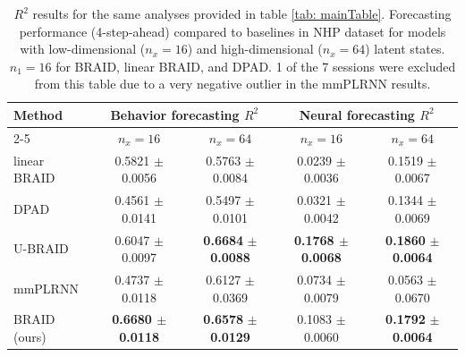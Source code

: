 \documentclass{article} %
\newcommand{\ourmethod}{BRAID}
\newcommand{\ourmethodlinear}{linear \ourmethod}
\newcommand{\ourmethodunsup}{U-\ourmethod}
\begin{document}

\begin{table}[h]
\caption{$R^2$ results for the same analyses provided in table \ref{tab: mainTable}. Forecasting performance (4-step-ahead) compared to baselines in NHP dataset for models with low-dimensional ($n_x\!=\!16$) and high-dimensional ($n_x\!=\!64$) latent states. $n_1\!=\!16$ for \ourmethod{}, \ourmethodlinear{}, and DPAD.
1 of the 7 sessions were excluded from this table due to a very negative outlier in the mmPLRNN results. 
}
\label{tab: R2_main}
\begin{center}
\begin{tabular}{l|c|c|c|c}
\multirow{2}{*}{\textbf{Method}} & \multicolumn{2}{c|}{\textbf{Behavior forecasting $R^2$}} & \multicolumn{2}{c}{\textbf{Neural forecasting $R^2$}} \\ \cline{2-5} & $n_x=16$ & $n_x=64$ & $n_x=16$ & $n_x=64$ \\
\midrule
\ourmethodlinear{} & 0.5821 \(\pm\) 0.0056 & 0.5763 \(\pm\) 0.0084 & 0.0239 \(\pm\) 0.0036 & 0.1519 \(\pm\) 0.0067\\
DPAD & 0.4561 \(\pm\) 0.0141 & 0.5497 \(\pm\) 0.0101 &  0.0321 \(\pm\) 0.0042 & 0.1344 \(\pm\) 0.0069\\
\ourmethodunsup{} & 0.6047 \(\pm\) 0.0097 & \textbf{0.6684} \(\pm\) \textbf{0.0088} & \textbf{0.1768 \(\pm\) 0.0068} & \textbf{0.1860} \(\pm\) \textbf{0.0064}\\
mmPLRNN &  0.4737 \(\pm\) 0.0118 & 0.6127 \(\pm\) 0.0369 &  0.0734 \(\pm\) 0.0079 & 0.0563 \(\pm\) 0.0670\\
\midrule
\ourmethod{} (ours) & \textbf{0.6680 \(\pm\) 0.0118} & \textbf{0.6578} \(\pm\) \textbf{0.0129} & 0.1083 \(\pm\) 0.0060 & \textbf{0.1792} \(\pm\) \textbf{0.0064}\\
\end{tabular}
\end{center}
\end{table}


\clearpage
\end{document}
